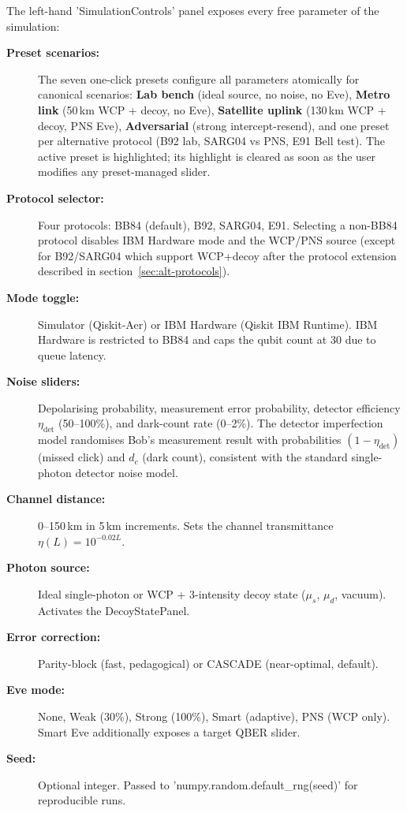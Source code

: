 \documentclass[12pt, a4paper]{article}
\begin{document}
The left-hand 'SimulationControls' panel exposes every free parameter
of the simulation:

\begin{description}
  \item[\textbf{Preset scenarios:}] The seven one-click presets configure all
        parameters atomically for canonical scenarios: \textbf{Lab bench}
        (ideal source, no noise, no Eve), \textbf{Metro link} (50\,km WCP +
        decoy, no Eve), \textbf{Satellite uplink} (130\,km WCP + decoy,
        PNS Eve), \textbf{Adversarial} (strong intercept-resend), and one
        preset per alternative protocol (B92 lab,
        SARG04 vs PNS, E91 Bell test). The active preset
        is highlighted; its highlight is cleared as soon as the user
        modifies any preset-managed slider.

  \item[\textbf{Protocol selector:}] Four protocols: BB84 (default), B92,
        SARG04, E91. Selecting a non-BB84 protocol disables IBM Hardware
        mode and the WCP/PNS source (except for B92/SARG04 which support
        WCP+decoy after the protocol extension described in
        section~\ref{sec:alt-protocols}).

  \item[\textbf{Mode toggle:}] Simulator (Qiskit-Aer) or IBM Hardware
        (Qiskit IBM Runtime). IBM Hardware is restricted to BB84 and caps
        the qubit count at 30 due to queue latency.

  \item[\textbf{Noise sliders:}] Depolarising probability, measurement
        error probability, detector efficiency $\eta_\mathrm{det}$
        (50--100\%), and dark-count rate (0--2\%). The detector imperfection
        model randomises Bob's measurement result with probabilities
        $(1 - \eta_\mathrm{det})$ (missed click) and $d_c$ (dark count),
        consistent with the standard single-photon detector noise model.

  \item[\textbf{Channel distance:}] 0--150\,km in 5\,km increments. Sets the
        channel transmittance $\eta(L) = 10^{-0.02L}$.

  \item[\textbf{Photon source:}] Ideal single-photon or WCP + 3-intensity
        decoy state ($\mu_s$, $\mu_d$, vacuum). Activates the DecoyStatePanel.

  \item[\textbf{Error correction:}] Parity-block (fast, pedagogical) or
        CASCADE (near-optimal, default).

  \item[\textbf{Eve mode:}] None, Weak (30\%), Strong (100\%), Smart
        (adaptive), PNS (WCP only). Smart Eve additionally exposes a
        target QBER slider.

  \item[\textbf{Seed:}] Optional integer. Passed to
        'numpy.random.default\_rng(seed)' for reproducible runs.
\end{description}
\end{document}
